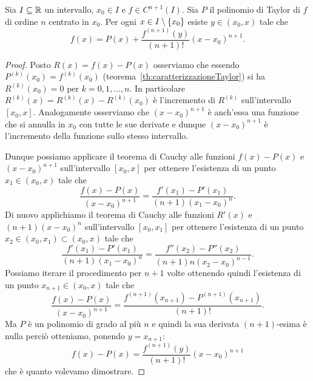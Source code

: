 \begin{theorem}
\label{th:taylor_lagrange}%
\mymark{**}%
%
%
Sia $I\subseteq {\mathbb R}$ un intervallo, $x_0\in I$
e $f\in C^{n+1}(I)$.
%
Sia $P$ il polinomio di Taylor di $f$ di ordine $n$ centrato in $x_0$.
Per ogni $x\in I\setminus{\left\{ x_0 \right\}}$ esiste $y\in (x_0,x)$
tale che
\[
  f(x) = P(x) + \frac{f^{(n+1)}(y)}{(n+1)!}(x-x_0)^{n+1}.
\]
\end{theorem}
%
\begin{proof}\mymark{*}%
Posto $R(x) = f(x)-P(x)$ osserviamo che essendo $P^{(k)}(x_0) = f^{(k)}(x_0)$
(teorema~\ref{th:caratterizzazioneTaylor})
si ha $R^{(k)}(x_0) = 0$ per $k=0,1, \dots, n$.
In particolare $R^{(k)}(x) = R^{(k)}(x)-R^{(k)}(x_0)$ è l'incremento di $R^{(k)}$
sull'intervallo $[x_0,x]$.
Analogamente osserviamo che $(x-x_0)^{n+1}$ è anch'essa
una funzione che si annulla in $x_0$ con tutte le sue derivate
e dunque $(x-x_0)^{n+1}$ è
l'incremento della funzione sullo stesso intervallo.

Dunque possiamo applicare il teorema di Cauchy alle funzioni
$f(x)-P(x)$ e $(x-x_0)^{n+1}$ sull'intervallo $[x_0,x]$ per ottenere
l'esistenza di un punto $x_1\in (x_0,x)$ tale che
\[
  \frac{f(x)-P(x)}{(x-x_0)^{n+1}}
  = \frac{f'(x_1)-P'(x_1)}{(n+1)(x_1-x_0)^n}.
\]
Di nuovo applichiamo il teorema di Cauchy alle funzioni $R'(x)$ e $(n+1)(x-x_0)^n$ sull'intervallo $[x_0,x_1]$ per ottenere
l'esistenza di un punto $x_2\in(x_0,x_1)\subset(x_0,x)$ tale che
\[
\frac{f'(x_1)-P'(x_1)}{(n+1)(x_1-x_0)^n} = \frac{f''(x_2)-P''(x_2)}{(n+1)n(x_2-x_0)^{n-1}}.
\]
Possiamo iterare il procedimento per $n+1$ volte ottenendo quindi
l'esistenza di
un punto $x_{n+1}\in(x_0,x)$ tale che
\[
  \frac{f(x)-P(x)}{(x-x_0)^{n+1}} = \frac{f^{(n+1)}(x_{n+1}) - P^{(n+1)}(x_{n+1})}{(n+1)!}.
\]
Ma $P$ è un polinomio di grado al più $n$ e quindi la sua derivata $(n+1)$-esima è nulla
perciò otteniamo, ponendo $y=x_{n+1}$:
\[
f(x) - P(x) = \frac{f^{(n+1)}(y)}{(n+1)!}(x-x_0)^{n+1}
\]
che è quanto volevamo dimostrare.
\end{proof}

